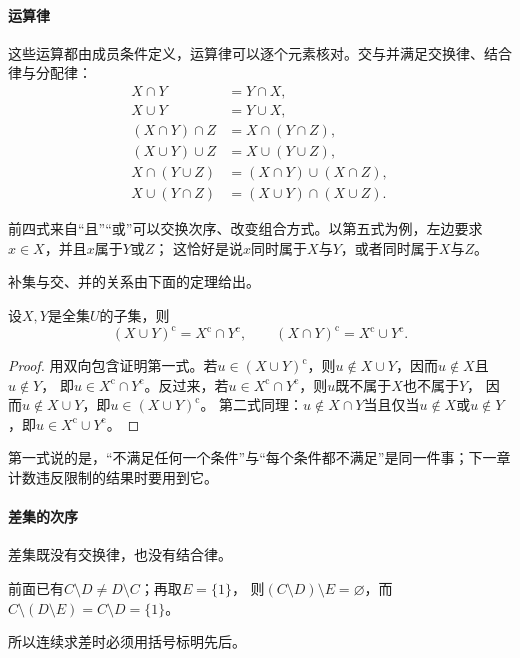 \paragraph{运算律}
这些运算都由成员条件定义，运算律可以逐个元素核对。交与并满足交换律、结合律与分配律：
\begin{align*}
 X\cap Y&=Y\cap X,\\
 X\cup Y&=Y\cup X,\\
 (X\cap Y)\cap Z&=X\cap(Y\cap Z),\\
 (X\cup Y)\cup Z&=X\cup(Y\cup Z),\\
 X\cap(Y\cup Z)&=(X\cap Y)\cup(X\cap Z),\\
 X\cup(Y\cap Z)&=(X\cup Y)\cap(X\cup Z).
\end{align*}

前四式来自“且”“或”可以交换次序、改变组合方式。以第五式为例，左边要求$x\in X$，并且$x$属于$Y$或$Z$；
这恰好是说$x$同时属于$X$与$Y$，或者同时属于$X$与$Z$。

补集与交、并的关系由下面的定理给出。
\begin{theorem}[De Morgan律]
\label{thm:sets-de-morgan}
设$X,Y$是全集$U$的子集，则
\begin{equation}
 (X\cup Y)^{\mathrm c}=X^{\mathrm c}\cap Y^{\mathrm c},\qquad
 (X\cap Y)^{\mathrm c}=X^{\mathrm c}\cup Y^{\mathrm c}.
 \label{eq:prelim-de-morgan-two-sets}
\end{equation}
\end{theorem}
\begin{proof}
用双向包含证明第一式。若$u\in(X\cup Y)^{\mathrm c}$，则$u\notin X\cup Y$，因而$u\notin X$且$u\notin Y$，
即$u\in X^{\mathrm c}\cap Y^{\mathrm c}$。反过来，若$u\in X^{\mathrm c}\cap Y^{\mathrm c}$，则$u$既不属于$X$也不属于$Y$，
因而$u\notin X\cup Y$，即$u\in(X\cup Y)^{\mathrm c}$。
第二式同理：$u\notin X\cap Y$当且仅当$u\notin X$或$u\notin Y$，即$u\in X^{\mathrm c}\cup Y^{\mathrm c}$。
\end{proof}
第一式说的是，“不满足任何一个条件”与“每个条件都不满足”是同一件事；下一章计数违反限制的结果时要用到它。

\paragraph{差集的次序}
差集既没有交换律，也没有结合律。
\begin{example}[差集不满足交换律与结合律]
\label{ex:sets-difference-order}
前面已有$C\setminus D\neq D\setminus C$；再取$E=\{1\}$，
则$(C\setminus D)\setminus E=\varnothing$，而$C\setminus(D\setminus E)=C\setminus D=\{1\}$。
\end{example}
所以连续求差时必须用括号标明先后。

